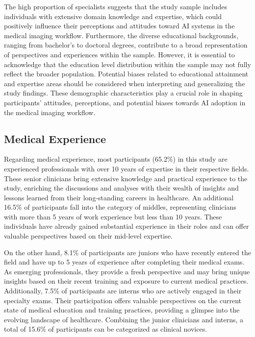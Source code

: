 The high proportion of specialists suggests that the study sample includes individuals with extensive domain knowledge and expertise, which could positively influence their perceptions and attitudes toward \ac{AI} systems in the medical imaging workflow.
Furthermore, the diverse educational backgrounds, ranging from bachelor's to doctoral degrees, contribute to a broad representation of perspectives and experiences within the sample.
However, it is essential to acknowledge that the education level distribution within the sample may not fully reflect the broader population.
Potential biases related to educational attainment and expertise areas should be considered when interpreting and generalizing the study findings.
These demographic characteristics play a crucial role in shaping participants' attitudes, perceptions, and potential biases towards \ac{AI} adoption in the medical imaging workflow.

\subsection{Medical Experience}
\label{chap:app002003001}

Regarding medical experience, most participants (65.2\%) in this study are experienced professionals with over 10 years of expertise in their respective fields.
These senior clinicians bring extensive knowledge and practical experience to the study, enriching the discussions and analyses with their wealth of insights and lessons learned from their long-standing careers in healthcare.
An additional 16.5\% of participants fall into the category of middles, representing clinicians with more than 5 years of work experience but less than 10 years.
These individuals have already gained substantial experience in their roles and can offer valuable perspectives based on their mid-level expertise.

On the other hand, 8.1\% of participants are juniors who have recently entered the field and have up to 5 years of experience after completing their medical exams.
As emerging professionals, they provide a fresh perspective and may bring unique insights based on their recent training and exposure to current medical practices.
Additionally, 7.5\% of participants are interns who are actively engaged in their specialty exams.
Their participation offers valuable perspectives on the current state of medical education and training practices, providing a glimpse into the evolving landscape of healthcare.
Combining the junior clinicians and interns, a total of 15.6\% of participants can be categorized as clinical novices.

